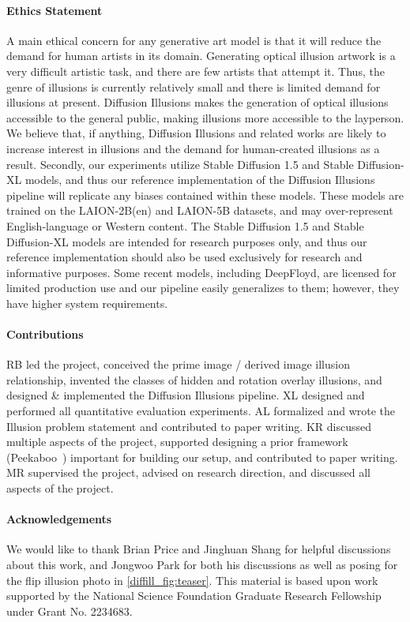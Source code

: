\paragraph{Ethics Statement}
A main ethical concern for any generative art model is that it will reduce the demand for human artists in its domain. Generating optical illusion artwork is a very difficult artistic task, and there are few artists that attempt it. Thus, the genre of illusions is currently relatively small and there is limited demand for illusions at present. Diffusion Illusions makes the generation of optical illusions accessible to the general public, making illusions more accessible to the layperson. We believe that, if anything, Diffusion Illusions and related works are likely to increase interest in illusions and the demand for human-created illusions as a result.
Secondly, our experiments utilize Stable Diffusion 1.5 and Stable Diffusion-XL models, and thus our reference implementation of the Diffusion Illusions pipeline will replicate any biases contained within these models. These models are trained on the LAION-2B(en) and LAION-5B datasets, and may over-represent English-language or Western content. The Stable Diffusion 1.5 and Stable Diffusion-XL models are intended for research purposes only, and thus our reference implementation should also be used exclusively for research and informative purposes. Some recent models, including DeepFloyd, are licensed for limited production use and our pipeline easily generalizes to them; however, they have higher system requirements.

\paragraph{Contributions}
RB led the project, conceived the prime image / derived image illusion relationship, invented the classes of hidden and rotation overlay illusions, and designed \& implemented the Diffusion Illusions pipeline.
XL designed and performed all quantitative evaluation experiments.
AL formalized and wrote the Illusion problem statement and contributed to paper writing.
KR discussed multiple aspects of the project, supported designing a prior framework (Peekaboo~\cite{Burgert2022PeekabooTT}) important for building our setup, and contributed to paper writing.
MR supervised the project, advised on research direction, and discussed all aspects of the project.

\paragraph{Acknowledgements}
We would like to thank Brian Price and Jinghuan Shang for helpful discussions about this work, and Jongwoo Park for both his discussions as well as posing for the flip illusion photo in \cref{diffill_fig:teaser}. This material is based upon work supported by the National Science Foundation Graduate Research Fellowship under Grant No. 2234683.
